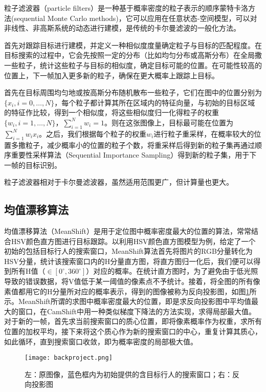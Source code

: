   粒子滤波器（particle filters）是一种基于概率密度的粒子表示的顺序蒙特卡洛方法(sequential Monte Carlo methods)，它可以应用在任意状态-空间模型，可以对非线性、非高斯系统的动态进行建模，是传统的卡尔曼滤波的一般化方法\cite{arulampalam2002tutorial}。

  首先对跟踪目标进行建模，并定义一种相似度度量确定粒子与目标的匹配程度。在目标搜索的过程中，它会先按照一定的分布（比如均匀分布或高斯分布）在全局撒一些粒子，统计这些粒子与目标的相似度，确定目标可能的位置。在可能性较高的位置上，下一帧加入更多新的粒子，确保在更大概率上跟踪上目标。

  首先在目标周围均匀地或按高斯分布随机散布一些粒子，它们在图中的位置分别为$\{x_i,i=0,\dots,N\}$，每个粒子都计算其所在区域内的特征向量，与初始的目标区域的特征作比较，得到一个相似度，将这些相似度归一化得粒子的权重$\{w_i,i=1,\dots,N\}$，$\sum_{i=1}^N w_i = 1$。则在这张图像上，目标最可能在位置为$\sum_{i=1}^N w_i x_i$。之后，我们根据每个粒子的权重$w_i$进行粒子重采样，在概率较大的位置多撒粒子，减少概率小的位置的粒子个数，将重采样后得到新的粒子集再通过顺序重要性采样算法（Sequential Importance Sampling）得到新的粒子集，用于下一帧的目标识别。

  粒子滤波器相对于卡尔曼滤波器，虽然适用范围更广，但计算量也更大。

\subsection{均值漂移算法}
 
  均值漂移算法（MeanShift）是用于定位图中概率密度最大的位置的算法，常常结合HSV颜色直方图进行目标跟踪。以利用HSV颜色直方图模型为例，给定了一个初始的包括目标行人的搜索窗口，MeanShift算法首先将图片的RGB分量转化为HSV分量，统计该搜索窗口内的H分量直方图，将直方图归一化后，我们便可以得到所有H值（$\in [0^{\circ},360^{\circ}]$）对应的概率。在统计直方图时，为了避免由于低光照导致的错误数据，将V值低于某一阈值的像素点不予统计。接着，将全图的所有像素值都用它的H分量所对应的概率表示，得到的图像被称为反向投影图，如图\ref{fig:backproject}所示。MeanShift所谓的求图中概率密度最大的位置，即是求反向投影图中平均值最大的窗口，在CamShift中用一种类似梯度下降法的方法实现，求得局部最大值。对于新的一帧，首先求当前搜索窗口的质心位置，即将像素概率作为权重，求所有位置的加权平均，接下来将这个质心作为新的搜索窗口的中心，重复计算其质心，如此循环，直到搜索窗口收敛，即为概率密度的局部极大值。

\begin{figure}[htb]
  \centering
  \texttt{[image: backproject.png]}
  \caption{左：原图像，蓝色框内为初始提供的含目标行人的搜索窗口；右：反向投影图}
  \label{fig:backproject}
\end{figure}

